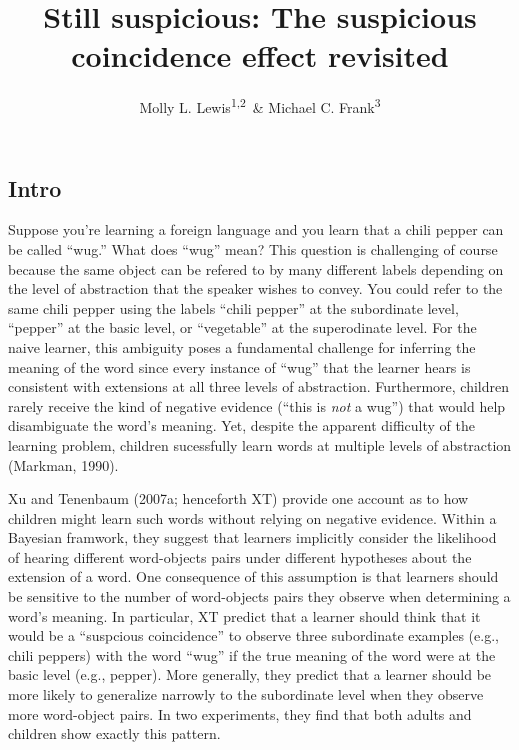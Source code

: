 \documentclass[english,floatsintext,man]{apa6}
\title{Still suspicious: The suspicious coincidence effect revisited}
\author{Molly L. Lewis\textsuperscript{1,2}~\& Michael C. Frank\textsuperscript{3}}
\affiliation{
    \vspace{0.5cm}
          \textsuperscript{1} Computation Institute, University of Chicago\\
          \textsuperscript{2} Department of Psychology, University of Wisconsin, Madison\\
          \textsuperscript{3} Department of Psychology, Stanford University  }
\theoremstyle{definition}
\theoremstyle{definition}
\theoremstyle{remark}
\begin{document}
\maketitle

\setcounter{secnumdepth}{0}



\subsection{Intro}\label{intro}

Suppose you're learning a foreign language and you learn that a chili
pepper can be called \enquote{wug.} What does \enquote{wug} mean? This
question is challenging of course because the same object can be refered
to by many different labels depending on the level of abstraction that
the speaker wishes to convey. You could refer to the same chili pepper
using the labels \enquote{chili pepper} at the subordinate level,
\enquote{pepper} at the basic level, or \enquote{vegetable} at the
superodinate level. For the naive learner, this ambiguity poses a
fundamental challenge for inferring the meaning of the word since every
instance of \enquote{wug} that the learner hears is consistent with
extensions at all three levels of abstraction. Furthermore, children
rarely receive the kind of negative evidence (\enquote{this is
\emph{not} a wug}) that would help disambiguate the word's meaning. Yet,
despite the apparent difficulty of the learning problem, children
sucessfully learn words at multiple levels of abstraction (Markman,
1990).

Xu and Tenenbaum (2007a; henceforth XT) provide one account as to how
children might learn such words without relying on negative evidence.
Within a Bayesian framwork, they suggest that learners implicitly
consider the likelihood of hearing different word-objects pairs under
different hypotheses about the extension of a word. One consequence of
this assumption is that learners should be sensitive to the number of
word-objects pairs they observe when determining a word's meaning. In
particular, XT predict that a learner should think that it would be a
\enquote{suspcious coincidence} to observe three subordinate examples
(e.g., chili peppers) with the word \enquote{wug} if the true meaning of
the word were at the basic level (e.g., pepper). More generally, they
predict that a learner should be more likely to generalize narrowly to
the subordinate level when they observe more word-object pairs. In two
experiments, they find that both adults and children show exactly this
pattern.
\end{document}
